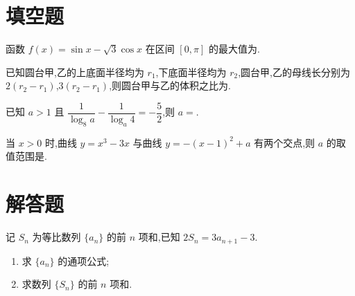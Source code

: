 \section{填空题}

\begin{problem}
函数 \(f(x)=\sin x-\sqrt3\cos x\) 在区间 \([0,\pi]\) 的最大值为\fillinblank{}.
\end{problem}

\begin{problem}
已知圆台甲,乙的上底面半径均为 \(r_1\),下底面半径均为 \(r_2\),圆台甲,乙的母线长分别为 \(2(r_2-r_1)\),\(3(r_2-r_1)\),则圆台甲与乙的体积之比为\fillinblank{}.
\end{problem}

\begin{problem}
已知 \(a>1\) 且 \(\dfrac1{\log_8a}-\dfrac1{\log_a4}=-\dfrac52\),则 \(a=\)\fillinblank{}.
\end{problem}

\begin{problem}
当 \(x>0\) 时,曲线 \(y=x^3-3x\) 与曲线 \(y=-(x-1)^2+a\) 有两个交点,则 \(a\) 的取值范围是\fillinblank{}.
\end{problem}

\section{解答题}

\begin{problem}
记 \(S_n\) 为等比数列 \(\{a_n\}\) 的前 \(n\) 项和,已知 \(2S_n=3a_{n+1}-3\).
\begin{enumerate}
\item 求 \(\{a_n\}\) 的通项公式;
\item 求数列 \(\{S_n\}\) 的前 \(n\) 项和.
\end{enumerate}
\end{problem}

